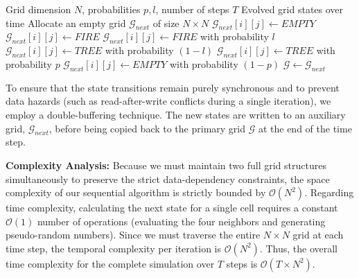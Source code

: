 \begin{algorithm}[H]
\caption{Sequential Forest Fire Simulation}
\label{alg:sequential_forest}
\begin{algorithmic}[1]
\REQUIRE Grid dimension $N$, probabilities $p, l$, number of steps $T$
\ENSURE Evolved grid states over time
    \STATE Allocate an empty grid $\mathcal{G}_{next}$ of size $N \times N$
            \STATE $\mathcal{G}_{next}[i][j] \leftarrow EMPTY$
                \STATE $\mathcal{G}_{next}[i][j] \leftarrow FIRE$
            \ELSE
                \STATE $\mathcal{G}_{next}[i][j] \leftarrow FIRE$ with probability $l$
                \STATE $\mathcal{G}_{next}[i][j] \leftarrow TREE$ with probability $(1 - l)$
            \ENDIF
            \STATE $\mathcal{G}_{next}[i][j] \leftarrow TREE$ with probability $p$
            \STATE $\mathcal{G}_{next}[i][j] \leftarrow EMPTY$ with probability $(1 - p)$
        \ENDIF
    \ENDFOR
    \STATE $\mathcal{G} \leftarrow \mathcal{G}_{next}$
\ENDFOR
\end{algorithmic}
\end{algorithm}

To ensure that the state transitions remain purely synchronous and to prevent data hazards (such as read-after-write conflicts during a single iteration), we employ a double-buffering technique. The new states are written to an auxiliary grid, $\mathcal{G}_{next}$, before being copied back to the primary grid $\mathcal{G}$ at the end of the time step.

\textbf{Complexity Analysis:} 
Because we must maintain two full grid structures simultaneously to preserve the strict data-dependency constraints, the space complexity of our sequential algorithm is strictly bounded by $\mathcal{O}(N^2)$. Regarding time complexity, calculating the next state for a single cell requires a constant $\mathcal{O}(1)$ number of operations (evaluating the four neighbors and generating pseudo-random numbers). Since we must traverse the entire $N \times N$ grid at each time step, the temporal complexity per iteration is $\mathcal{O}(N^2)$. Thus, the overall time complexity for the complete simulation over $T$ steps is $\mathcal{O}(T \times N^2)$.
